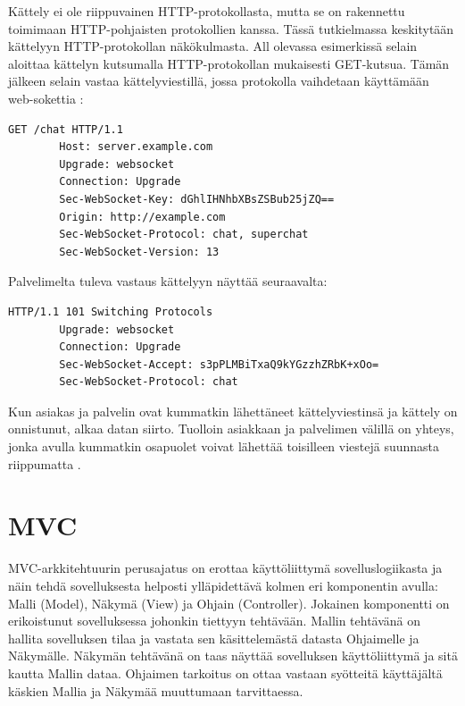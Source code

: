 \documentclass[utf8]{gradu3}
\begin{document}
Kättely ei ole riippuvainen HTTP-protokollasta, mutta se on rakennettu toimimaan HTTP-pohjaisten protokollien kanssa. Tässä tutkielmassa keskitytään kättelyyn HTTP-protokollan näkökulmasta. All olevassa esimerkissä selain aloittaa kättelyn kutsumalla HTTP-protokollan mukaisesti GET-kutsua. Tämän jälkeen selain vastaa kättelyviestillä, jossa protokolla vaihdetaan käyttämään web-sokettia \parencite[s. 1.1]{websocket}:

\begin{lstlisting}[language=Smalltalk]
        GET /chat HTTP/1.1
        Host: server.example.com
        Upgrade: websocket
        Connection: Upgrade
        Sec-WebSocket-Key: dGhlIHNhbXBsZSBub25jZQ==
        Origin: http://example.com
        Sec-WebSocket-Protocol: chat, superchat
        Sec-WebSocket-Version: 13
\end{lstlisting}

Palvelimelta tuleva vastaus kättelyyn näyttää seuraavalta:
\begin{lstlisting}[language=Smalltalk]
         HTTP/1.1 101 Switching Protocols
        Upgrade: websocket
        Connection: Upgrade
        Sec-WebSocket-Accept: s3pPLMBiTxaQ9kYGzzhZRbK+xOo=
        Sec-WebSocket-Protocol: chat
\end{lstlisting}

Kun asiakas ja palvelin ovat kummatkin lähettäneet kättelyviestinsä ja kättely on onnistunut, alkaa datan siirto. Tuolloin asiakkaan ja palvelimen välillä on yhteys, jonka avulla kummatkin osapuolet voivat lähettää toisilleen viestejä suunnasta riippumatta \parencite[s. 1.2]{websocket}. 


\chapter{MVC}
MVC-arkkitehtuurin perusajatus on erottaa käyttöliittymä sovelluslogiikasta ja
näin tehdä sovelluksesta helposti ylläpidettävä kolmen eri komponentin avulla:
Malli (Model), Näkymä (View) ja Ohjain (Controller). Jokainen komponentti on
erikoistunut sovelluksessa johonkin tiettyyn tehtävään. Mallin tehtävänä on
hallita sovelluksen tilaa ja vastata sen käsittelemästä datasta Ohjaimelle ja Näkymälle.
Näkymän tehtävänä on taas näyttää sovelluksen käyttöliittymä ja sitä kautta Mallin dataa. 
Ohjaimen tarkoitus on ottaa vastaan syötteitä käyttäjältä käskien Mallia ja Näkymää muuttumaan tarvittaessa.
\end{document}
